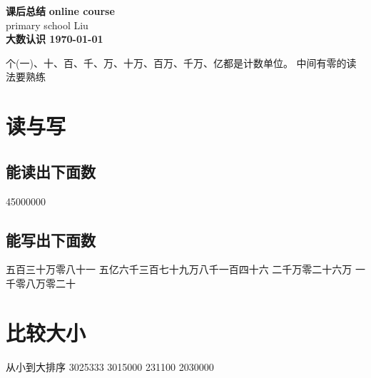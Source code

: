 \documentclass[DIN, pagenumber=false, fontsize=11pt, parskip=half]{scrartcl}
\newcommand{\mytitle}[1]{{\noindent\Large\textbf{#1}}}
\begin{document}
\noindent\textbf{课后总结} \hfill \textbf{online course}\\
primary school \hfill Liu\\

\mytitle{大数认识 \hfill \today}
\newline
\begin{parchmentquote}
    个(一)、十、百、千、万、十万、百万、千万、亿都是计数单位。\newline
    中间有零的读法要熟练

\end{parchmentquote}


\section{读与写}

\subsection{能读出下面数}
45000000 \;\;\;\;\;\;  \;\;\;\;\;\;
\subsection{能写出下面数}
五百三十万零八十一\newline
五亿六千三百七十九万八千一百四十六\newline
二千万零二十六万\newline
一千零八万零二十\newline
\section{比较大小}
从小到大排序 
3025333
3015000
231100
2030000
\end{document}
